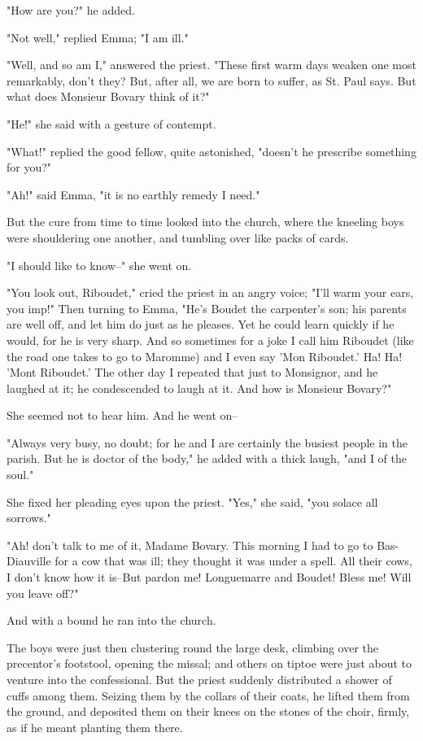 \documentclass[11pt,twocolumn]{ltugboat}
\begin{document}
"How are you?" he added.

"Not well," replied Emma; "I am ill."

"Well, and so am I," answered the priest. "These first warm days weaken
one most remarkably, don't they? But, after all, we are born to suffer,
as St. Paul says. But what does Monsieur Bovary think of it?"

"He!" she said with a gesture of contempt.

"What!" replied the good fellow, quite astonished, "doesn't he prescribe
something for you?"

"Ah!" said Emma, "it is no earthly remedy I need."

But the cure from time to time looked into the church, where the
kneeling boys were shouldering one another, and tumbling over like packs
of cards.

"I should like to know--" she went on.

"You look out, Riboudet," cried the priest in an angry voice; "I'll warm
your ears, you imp!" Then turning to Emma, "He's Boudet the carpenter's
son; his parents are well off, and let him do just as he pleases. Yet he
could learn quickly if he would, for he is very sharp. And so sometimes
for a joke I call him Riboudet (like the road one takes to go to
Maromme) and I even say 'Mon Riboudet.' Ha! Ha! 'Mont Riboudet.' The
other day I repeated that just to Monsignor, and he laughed at it; he
condescended to laugh at it. And how is Monsieur Bovary?"

She seemed not to hear him. And he went on--

"Always very busy, no doubt; for he and I are certainly the busiest
people in the parish. But he is doctor of the body," he added with a
thick laugh, "and I of the soul."

She fixed her pleading eyes upon the priest. "Yes," she said, "you
solace all sorrows."

"Ah! don't talk to me of it, Madame Bovary. This morning I had to go to
Bas-Diauville for a cow that was ill; they thought it was under a spell.
All their cows, I don't know how it is--But pardon me! Longuemarre and
Boudet! Bless me! Will you leave off?"

And with a bound he ran into the church.

The boys were just then clustering round the large desk, climbing over
the precentor's footstool, opening the missal; and others on tiptoe were
just about to venture into the confessional. But the priest suddenly
distributed a shower of cuffs among them. Seizing them by the collars of
their coats, he lifted them from the ground, and deposited them on their
knees on the stones of the choir, firmly, as if he meant planting them
there.
\end{document}
